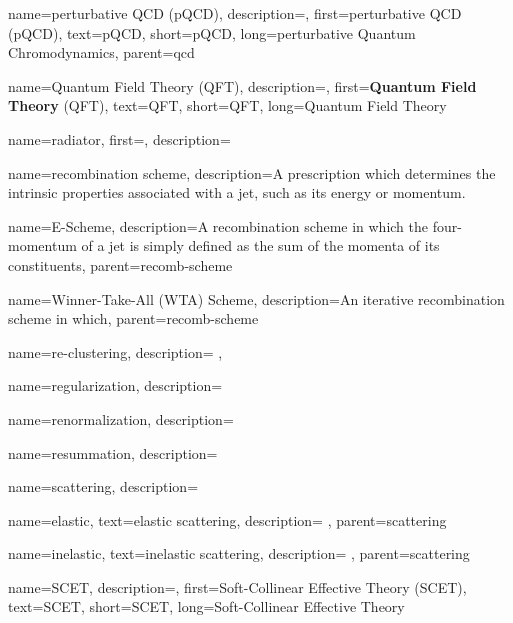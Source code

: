     {
        name=perturbative QCD (pQCD),
        description={},
        first={perturbative QCD (pQCD)},
        text={pQCD},
        short={pQCD},
        long={perturbative Quantum Chromodynamics},
        parent=qcd
    }



{
    name=Quantum Field Theory (QFT),
    description={},
    first={\textbf{Quantum Field Theory} (QFT)},
    text={QFT},
    short={QFT},
    long={Quantum Field Theory}
}


{
  name=radiator,
  first=,
  description={}
}


{
  name=recombination scheme,
  description={A prescription which determines the intrinsic properties associated with a jet, such as its energy or momentum.}
}

{
  name=E-Scheme,
  description={A recombination scheme in which the four-momentum of a jet is simply defined as the sum of the momenta of its constituents},
  parent=recomb-scheme
}


{
  name=Winner-Take-All (WTA) Scheme,
  description={An iterative recombination scheme in which},
  parent=recomb-scheme
}


{
    name=re-clustering,
    description={
    },
}


{
  name=regularization,
  description={}
}

{
  name=renormalization,
  description={}
}


{
  name=resummation,
  description={}
}



{
    name=scattering,
    description={
    }
}

{
    name=elastic,
    text=elastic scattering,
    description={
    },
    parent=scattering
}

{
    name=inelastic,
    text=inelastic scattering,
    description={
    },
    parent=scattering
}

{
    name=SCET,
    description={},
    first={Soft-Collinear Effective Theory (SCET)},
    text={SCET},
    short={SCET},
    long={Soft-Collinear Effective Theory}
}


